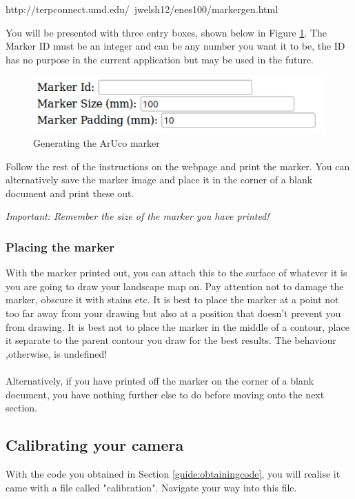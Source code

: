 \documentclass[11pt]{article}
\begin{document}
\begin{center}
http://terpconnect.umd.edu/~jwelsh12/enes100/markergen.html
\end{center}

You will be presented with three entry boxes, shown below in
Figure \ref{guide:markergeneration}. The Marker ID must be an integer
and can be any number you want it to be, the ID has no purpose in
the current application but may be used in the future. 

\begin{figure}[H]
	\centering
	\includegraphics[scale=0.8]{userguide/markersite.png}
	\caption{Generating the ArUco marker}
	\label{guide:markergeneration}
\end{figure}

Follow the rest of the instructions on the webpage and print the marker.
You can alternatively save the marker image and place it in the corner of a
blank document and print these out.
\begin{center}
	\textit{Important: Remember the size of the marker you have printed!}
\end{center}

\subsubsection*{Placing the marker}
With the marker printed out, you can attach this to the surface of 
whatever it is you are going to draw your landscape map on. Pay
attention not to damage the marker, obscure it with stains etc. It
is best to place the marker at a point not too far away from your
drawing but also at a position that doesn't prevent you from drawing.
It is best not to place the marker in the middle of a contour,
place it separate to the parent contour you draw for the best
results. The behaviour ,otherwise, is undefined!\\
\\
Alternatively, if you have printed off the marker on the corner of 
a blank document, you have nothing further else to do before moving onto 
the next section.

\newpage
\subsection{Calibrating your camera}
With the code you obtained in Section \ref{guide:obtainingcode}, you
will realise it came with a file called "calibration". Navigate your way 
into this file.
\end{document}
